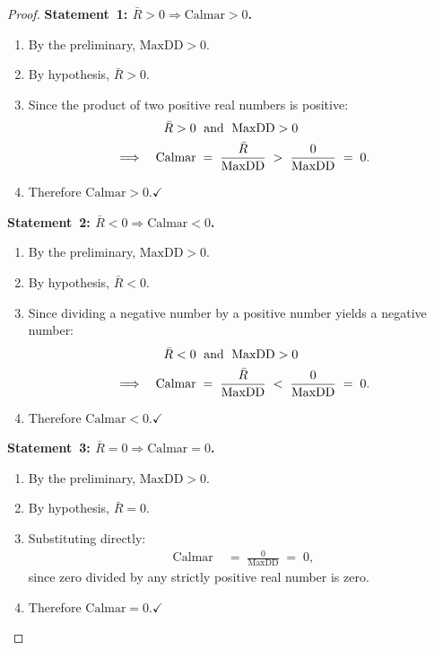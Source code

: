 \documentclass[12pt,openany]{book}
\newcommand{\MaxDD}{\mathrm{MaxDD}}
\numberwithin{equation}{chapter}
\theoremstyle{plain}
\theoremstyle{definition}
\theoremstyle{remark}
\numberwithin{equation}{chapter}
\theoremstyle{plain}
\begin{document}
\begin{proof}
\medskip
\noindent\textbf{Statement~1: $\bar{R} > 0 \Rightarrow
\mathrm{Calmar} > 0$.}

\begin{enumerate}
  \item By the preliminary, $\MaxDD > 0$.
  \item By hypothesis, $\bar{R} > 0$.
  \item Since the product of two positive real numbers is
        positive:
        \begin{align}
          \bar{R} > 0
            &\;\text{ and }\;
           \MaxDD > 0 \notag \\
          \;\Longrightarrow\quad
          \mathrm{Calmar}
            &\;=\; \frac{\bar{R}}{\MaxDD}
             \;>\; \frac{0}{\MaxDD}
             \;=\; 0.
          \label{eq:calmar-proof-pos}
        \end{align}
  \item Therefore $\mathrm{Calmar} > 0$.\hfill$\checkmark$
\end{enumerate}

\medskip
\noindent\textbf{Statement~2: $\bar{R} < 0 \Rightarrow
\mathrm{Calmar} < 0$.}

\begin{enumerate}
  \item By the preliminary, $\MaxDD > 0$.
  \item By hypothesis, $\bar{R} < 0$.
  \item Since dividing a negative number by a positive
        number yields a negative number:
        \begin{align}
          \bar{R} < 0
            &\;\text{ and }\;
           \MaxDD > 0 \notag \\
          \;\Longrightarrow\quad
          \mathrm{Calmar}
            &\;=\; \frac{\bar{R}}{\MaxDD}
             \;<\; \frac{0}{\MaxDD}
             \;=\; 0.
          \label{eq:calmar-proof-neg}
        \end{align}
  \item Therefore $\mathrm{Calmar} < 0$.\hfill$\checkmark$
\end{enumerate}

\medskip
\noindent\textbf{Statement~3: $\bar{R} = 0 \Rightarrow
\mathrm{Calmar} = 0$.}

\begin{enumerate}
  \item By the preliminary, $\MaxDD > 0$.
  \item By hypothesis, $\bar{R} = 0$.
  \item Substituting directly:
        \begin{align}
          \mathrm{Calmar}
            &\;=\; \frac{0}{\MaxDD}
             \;=\; 0,
          \label{eq:calmar-proof-zero}
        \end{align}
        since zero divided by any strictly positive real
        number is zero.
  \item Therefore $\mathrm{Calmar} = 0$.\hfill$\checkmark$
\end{enumerate}


\end{proof}
\end{document}
